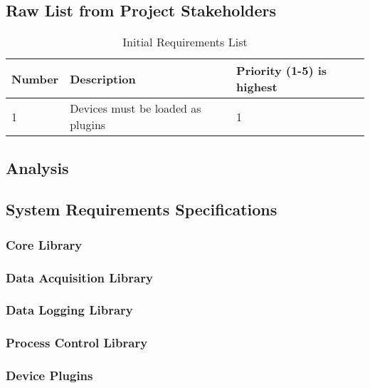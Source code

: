 \documentclass[11pt]{article}
\begin{document}
    \subsection{Raw List from Project Stakeholders}\label{sec:req-sh}

      \begin{table}[H]
        \centering
        \begin{tabular}{l p{11cm} p{3cm}}
          \toprule
          Number & Description & Priority (1-5)\newline 1 is highest \\ [0.5ex]
          \midrule
          1 & Devices must be loaded as plugins & 1 \\
          \bottomrule
        \end{tabular}
        \caption{Initial Requirements List}\label{tab:requirements}
      \end{table}

    \subsection{Analysis}\label{sec:req-analyze}

    \subsection{System Requirements Specifications}\label{sec:req-srs}

      \subsubsection{Core Library}\label{sec:req-srs-core}

      \subsubsection{Data Acquisition Library}\label{sec:req-srs-daq}

      \subsubsection{Data Logging Library}\label{sec:req-srs-log}

      \subsubsection{Process Control Library}\label{sec:req-srs-ctl}

      \subsubsection{Device Plugins}\label{sec:req-srs-dev-plug}
\end{document}

